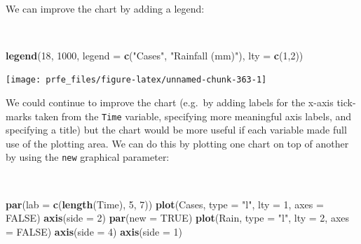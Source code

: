 \documentclass[12pt,a4paper]{book}
\newenvironment{Shaded}{\begin{snugshade}}{\end{snugshade}}
\newcommand{\DataTypeTok}[1]{\textcolor[rgb]{0.13,0.29,0.53}{#1}}
\newcommand{\DecValTok}[1]{\textcolor[rgb]{0.00,0.00,0.81}{#1}}
\newcommand{\KeywordTok}[1]{\textcolor[rgb]{0.13,0.29,0.53}{\textbf{#1}}}
\newcommand{\NormalTok}[1]{#1}
\newcommand{\OtherTok}[1]{\textcolor[rgb]{0.56,0.35,0.01}{#1}}
\newcommand{\StringTok}[1]{\textcolor[rgb]{0.31,0.60,0.02}{#1}}
\theoremstyle{definition}
\theoremstyle{definition}
\theoremstyle{definition}
\theoremstyle{remark}
\begin{document}
~

We can improve the chart by adding a legend:

~

\begin{Shaded}
\begin{Highlighting}[]
\KeywordTok{legend}\NormalTok{(}\DecValTok{18}\NormalTok{, }\DecValTok{1000}\NormalTok{, }\DataTypeTok{legend =} \KeywordTok{c}\NormalTok{(}\StringTok{"Cases"}\NormalTok{, }\StringTok{"Rainfall (mm)"}\NormalTok{), }\DataTypeTok{lty =} \KeywordTok{c}\NormalTok{(}\DecValTok{1}\NormalTok{,}\DecValTok{2}\NormalTok{))}
\end{Highlighting}
\end{Shaded}

\begin{center}\texttt{[image: prfe\_files/figure-latex/unnamed-chunk-363-1]} \end{center}

\newpage

We could continue to improve the chart (e.g.~by adding labels for the
x-axis tick-marks taken from the \texttt{Time} variable, specifying more
meaningful axis labels, and specifying a title) but the chart would be
more useful if each variable made full use of the plotting area. We can
do this by plotting one chart on top of another by using the
\texttt{new} graphical parameter:

~

\begin{Shaded}
\begin{Highlighting}[]
\KeywordTok{par}\NormalTok{(}\DataTypeTok{lab =} \KeywordTok{c}\NormalTok{(}\KeywordTok{length}\NormalTok{(Time), }\DecValTok{5}\NormalTok{, }\DecValTok{7}\NormalTok{))}
\KeywordTok{plot}\NormalTok{(Cases, }\DataTypeTok{type =} \StringTok{"l"}\NormalTok{, }\DataTypeTok{lty =} \DecValTok{1}\NormalTok{, }\DataTypeTok{axes =} \OtherTok{FALSE}\NormalTok{)}
\KeywordTok{axis}\NormalTok{(}\DataTypeTok{side =} \DecValTok{2}\NormalTok{)}
\KeywordTok{par}\NormalTok{(}\DataTypeTok{new =} \OtherTok{TRUE}\NormalTok{)}
\KeywordTok{plot}\NormalTok{(Rain, }\DataTypeTok{type =} \StringTok{"l"}\NormalTok{, }\DataTypeTok{lty =} \DecValTok{2}\NormalTok{, }\DataTypeTok{axes =} \OtherTok{FALSE}\NormalTok{)}
\KeywordTok{axis}\NormalTok{(}\DataTypeTok{side =} \DecValTok{4}\NormalTok{)}
\KeywordTok{axis}\NormalTok{(}\DataTypeTok{side =} \DecValTok{1}\NormalTok{)}
\end{Highlighting}
\end{Shaded}
\end{document}
